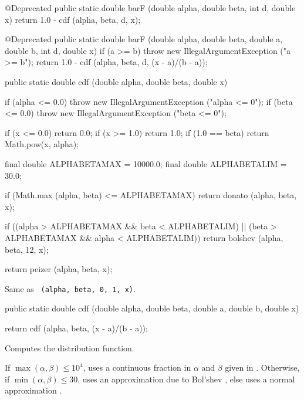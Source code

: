\begin{code}
\begin{hide}
   @Deprecated
   public static double barF (double alpha, double beta, int d, double x) {
      return 1.0 - cdf (alpha, beta, d, x);
   }


   @Deprecated
   public static double barF (double alpha, double beta,
                              double a, double b, int d, double x) {
      if (a >= b)
         throw new IllegalArgumentException ("a >= b");
      return 1.0 - cdf (alpha, beta, d, (x - a)/(b - a));
   }

   \end{hide}

   public static double cdf (double alpha, double beta, double x)\begin{hide} {
      if (alpha <= 0.0)
        throw new IllegalArgumentException ("alpha <= 0");
      if (beta <= 0.0)
        throw new IllegalArgumentException ("beta <= 0");

      if (x <= 0.0)
         return 0.0;
      if (x >= 1.0)
         return 1.0;
      if (1.0 == beta)
         return Math.pow(x, alpha);

      final double ALPHABETAMAX = 10000.0;
      final double ALPHABETALIM = 30.0;

      if (Math.max (alpha, beta) <= ALPHABETAMAX) {
         return donato (alpha, beta, x);
      }

      if ((alpha > ALPHABETAMAX && beta < ALPHABETALIM) ||
          (beta > ALPHABETAMAX && alpha < ALPHABETALIM)) {
         return bolshev (alpha, beta, 12, x);
      }

      return peizer (alpha, beta, x);
   }\end{hide}
\end{code}
\begin{tabb}  Same as
~\texttt{(alpha, beta, 0, 1, x)}.
\end{tabb}
\begin{code}

   public static double cdf (double alpha, double beta,
                             double a, double b, double x)\begin{hide} {
      return cdf (alpha, beta, (x - a)/(b - a));
   }\end{hide}
\end{code}
  \begin{tabb}
  Computes the distribution function.
\begin{detailed} If
   $\max (\alpha, \beta) \le 10^4$, uses a continuous fraction
  in $\alpha$ and $\beta$ given in \cite{tDID92a,tCUY08a}.
  Otherwise, if $\min (\alpha, \beta) \le 30$,
  uses an approximation due to Bol'shev \cite{tMAR78a},
  else uses a normal approximation \cite{tPEI68a}.
\end{detailed}
  \end{tabb}
